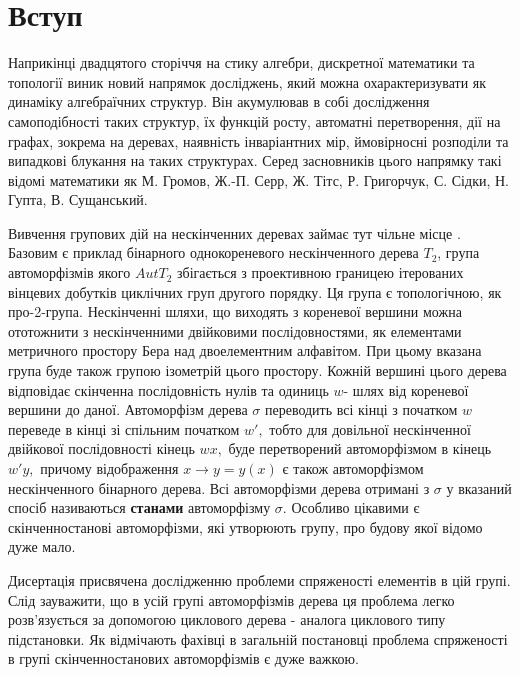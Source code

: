 \documentclass[a4paper,12pt]{article} \usepackage{a4wide}
\numberwithin{equation}{subsection}
\begin{document}
\section*{Вступ}


Наприкінці  двадцятого сторіччя на стику алгебри, дискретної математики та топології виник новий напрямок
досліджень, який можна охарактеризувати як динаміку алгебраїчних структур. Він акумулював в собі дослідження
самоподібності таких структур, їх функцій росту, автоматні перетворення, дії на графах, зокрема на деревах,
наявність інваріантних мір, ймовірносні розподіли та випадкові блукання на таких структурах. Серед засновників
цього напрямку такі відомі математики як М. Громов, Ж.-П. Серр, Ж. Тітс, Р. Григорчук, С. Сідки, Н. Гупта, В.
Сущанський.

Вивчення групових дій на нескінченних деревах займає тут чільне
місце
. Базовим  є
приклад бінарного однокореневого нескінченного дерева $T_2$, група
автоморфізмів якого $Aut T_2$ збігається з проективною границею
ітерованих вінцевих добутків циклічних груп другого порядку. Ця
група є топологічною, як про-2-група. Нескінченні шляхи, що
виходять з кореневої вершини можна ототожнити з нескінченними
двійковими послідовностями, як елементами метричного простору Бера
над двоелементним алфавітом. При цьому вказана група буде також
групою ізометрій цього простору. Кожній вершині цього дерева
відповідає скінченна послідовність нулів та одиниць $w$- шлях від
кореневої вершини до даної. Автоморфізм дерева $\sigma$ переводить
всі кінці з початком $w$ переведе в кінці зі спільним початком
$w',$ тобто для довільної нескінченної двійкової послідовності
кінець $w x,$ буде перетворений автоморфізмом в кінець $w' y, $
причому відображення $x \to y=y (x)$ є також автоморфізмом
нескінченного бінарного дерева. Всі автоморфізми дерева отримані з
$\sigma$ у вказаний спосіб називаються {\bf станами} автоморфізму
$\sigma$. Особливо цікавими є скінченностанові автоморфізми, які
утворюють групу, про будову якої відомо дуже мало.\cite{Gr1}

Дисертація присвячена дослідженню проблеми спряженості елементів в цій групі. Слід зауважити, що в усій групі
автоморфізмів дерева ця проблема легко розв'язується за допомогою  циклового дерева  - аналога циклового типу
підстановки. Як відмічають фахівці в загальній постановці проблема спряженості в групі скінченностанових
автоморфізмів є дуже важкою.
\end{document}
